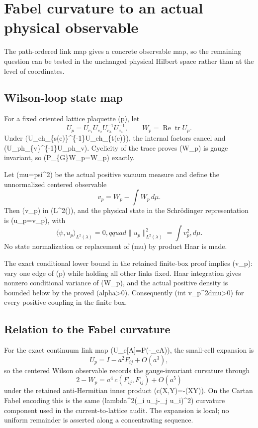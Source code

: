 \section{Fabel curvature to an actual physical
observable}\label{fabel-curvature-to-physical-state-md-fabel-curvature-to-an-actual-physical-observable}

The path-ordered link map gives a concrete observable map, so the
remaining question can be tested in the unchanged physical Hilbert space
rather than at the level of coordinates.

\subsection{Wilson-loop state map}\label{fabel-curvature-to-physical-state-md-wilson-loop-state-map}

For a fixed oriented lattice plaquette (p), let \[
U_p=U_{e_1}U_{e_2}U_{e_3}^{-1}U_{e_4}^{-1},\qquad W_p=\operatorname{Re}\operatorname{tr}U_p.
\] Under (U\_e\mapsto h\_\{s(e)\}\^{}\{-1\}U\_eh\_\{t(e)\}), the
internal factors cancel and (U\_p\mapsto h\_\{v\}\^{}\{-1\}U\_ph\_v).
Cyclicity of the trace proves (W\_p) is gauge invariant, so
(P\_\{\mathcal G\}W\_p=W\_p) exactly.

Let (mu=psi\^{}2\lambda) be the actual positive vacuum measure and
define the unnormalized centered observable \[
v_p=W_p-\int W_p\,d\mu.
\] Then (v\_p) in (L\^{}2(\mu)), and the physical state in the
Schrödinger representation is (u\_p=\psi v\_p), with \[
\langle\psi,u_p\rangle_{L^2(\lambda)}=0,qquad
\|u_p\|_{L^2(\lambda)}^2=\int v_p^2,d\mu.
\] No state normalization or replacement of (mu) by product Haar is
made.

The exact conditional lower bound in the retained finite-box proof
implies (v\_p): vary one edge of (p) while holding all other links
fixed. Haar integration gives nonzero conditional variance of (W\_p),
and the actual positive density is bounded below by the proved
(alpha\textgreater0). Consequently (int v\_p\^{}2dmu\textgreater0) for
every positive coupling in the finite box.

\subsection{Relation to the Fabel
curvature}\label{fabel-curvature-to-physical-state-md-relation-to-the-fabel-curvature}

For the exact continuum link map
(U\_e{[}\mathcal A{]}=\mathcal P\exp(-\int\_e\mathcal A)), the
small-cell expansion is \[
U_p=I-a^2F_{ij}+O(a^3),
\] so the centered Wilson observable records the gauge-invariant
curvature through \[
2-W_p=a^4\,c(F_{ij},F_{ij})+O(a^5)
\] under the retained anti-Hermitian inner product
(c(X,Y)=-(XY)). On the Cartan Fabel encoding
this is the same (lambda\^{}2(\partial\_i u\_j-\partial\_j u\_i)\^{}2)
curvature component used in the current-to-lattice audit. The expansion
is local; no uniform remainder is asserted along a concentrating
sequence.

